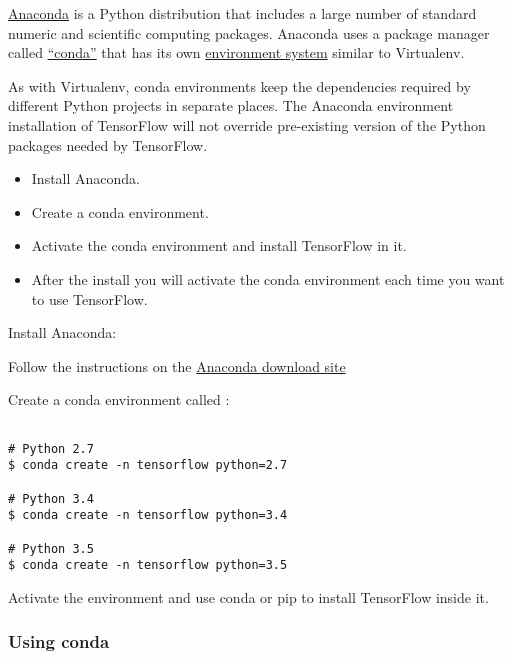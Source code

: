 \href{https://www.continuum.io/why-anaconda}{Anaconda} is a Python distribution that includes a large number of standard numeric and scientific computing packages. Anaconda uses a package manager called \href{http://conda.pydata.org/}{``conda''} that has its own \href{http://conda.pydata.org/docs/using/envs.html}{environment system} similar to Virtualenv.

  

As with Virtualenv, conda environments keep the dependencies required by different Python projects in separate places. The Anaconda environment installation of TensorFlow will not override pre-existing version of the Python packages needed by TensorFlow.

\begin{itemize}

\item Install Anaconda.

\item Create a conda environment.

\item Activate the conda environment and install TensorFlow in it.

\item After the install you will activate the conda environment each time you want to use TensorFlow.

\end{itemize}

Install Anaconda:

Follow the instructions on the \href{https://www.continuum.io/downloads}{Anaconda download site}

Create a conda environment called :

\begin{lstlisting}

# Python 2.7
$ conda create -n tensorflow python=2.7

# Python 3.4
$ conda create -n tensorflow python=3.4

# Python 3.5
$ conda create -n tensorflow python=3.5

\end{lstlisting}

Activate the environment and use conda or pip to install TensorFlow inside it.

\subsubsection {Using conda}

